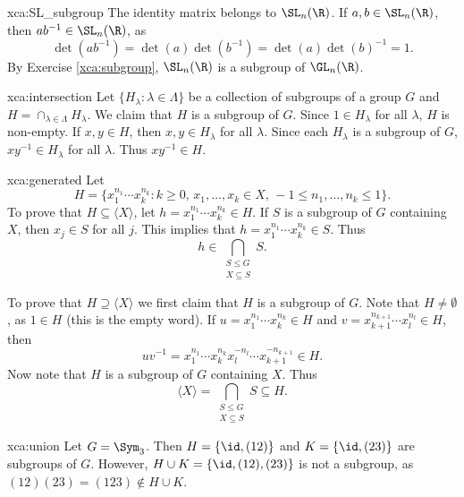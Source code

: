 \begin{sol}{xca:SL_subgroup}
    The identity matrix belongs to $\SL_n(\R)$. If $a,b\in\SL_n(\R)$, then 
    $ab^{-1}\in\SL_n(\R)$, as 
    \[
    \det(ab^{-1})=\det(a)\det(b^{-1})=\det(a)\det(b)^{-1}=1.
    \]
    By Exercise \ref{xca:subgroup}, $\SL_n(\R)$ is a subgroup of $\GL_n(\R)$. 
\end{sol}

\begin{sol}{xca:intersection}
    Let $\{H_\lambda:\lambda\in\Lambda\}$ be a collection of subgroups of a group $G$ and 
    $H=\cap_{\lambda\in \Lambda}H_\lambda$. We claim that $H$ is a subgroup of $G$. Since
    $1\in H_\lambda$ for all $\lambda$, $H$ is non-empty. If $x,y\in H$, then $x,y\in H_\lambda$ for all $\lambda$. 
    Since each $H_\lambda$ is a subgroup of $G$, $xy^{-1}\in H_\lambda$ for all $\lambda$. Thus $xy^{-1}\in H$.
\end{sol}

\begin{sol}{xca:generated}
    Let 
    \[
    H=\{x_1^{n_1}\cdots x_k^{n_k}:k\geq0,\,x_1,\dots,x_k\in X,\,-1\leq n_1,\dots,n_k\leq 1\}.
    \]
    To prove that $H\subseteq\langle X\rangle$, let $h=x_1^{n_1}\cdots x_k^{n_k}\in H$. 
    If $S$ is a subgroup of $G$ containing $X$, then $x_j\in S$ for all $j$. This implies that 
    $h=x_1^{n_1}\cdots x_k^{n_k}\in S$. Thus 
    \[
    h\in\bigcap_{\substack{S\leq G\\X\subseteq S}}S.
    \]
    
    To prove that $H\supseteq \langle X\rangle$ we first 
    claim that $H$ is a subgroup of $G$. Note that $H\ne\emptyset$, as $1\in H$ (this is the empty word). If 
    $u=x_1^{n_1}\cdots x_k^{n_k}\in H$ and 
    $v=x_{k+1}^{n_{k+1}}\cdots x_{l}^{n_l}\in H$, then 
    \[
    uv^{-1}=x_1^{n_1}\cdots x_k^{n_k}x_{l}^{-n_{l}}\cdots x_{k+1}^{-n_{k+1}}\in H. 
    \]
    Now note that $H$ is a subgroup of $G$ containing $X$. Thus 
    \[
    \langle X\rangle=\bigcap_{\substack{S\leq G\\X\subseteq S}}S\subseteq H.
    \]
\end{sol}

\begin{sol}{xca:union}
    Let $G=\Sym_3$. Then $H=\{\id,(12)\}$ and 
    $K=\{\id,(23)\}$ are subgroups of $G$. However, 
    $H\cup K=\{\id,(12),(23)\}$ is not a subgroup, as 
    $(12)(23)=(123)\not\in H\cup K$. 
\end{sol}


